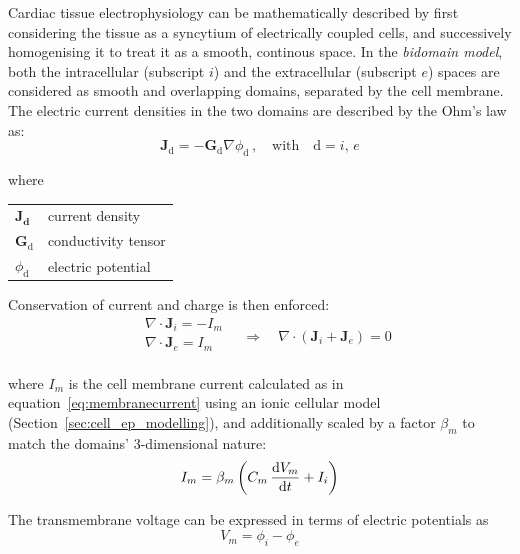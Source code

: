 \vspace{0.2cm}
Cardiac tissue electrophysiology can be mathematically described by first considering the tissue as a syncytium of electrically coupled cells, and successively homogenising it to treat it as a smooth, continous space. In the \textit{bidomain model}, both the intracellular (subscript $i$) and the extracellular (subscript $e$) spaces are considered as smooth and overlapping domains, separated by the cell membrane. The electric current densities in the two domains are described by the Ohm's law as:
%
\begin{equation}\label{eq:ohmslaw}
    \mathbf{J}_{\text{d}} = -\mathbf{G}_{\text{d}}\nabla\phi_{\text{d}}\,,\quad\text{with}\quad \text{d}=i,\,e
\end{equation}

\noindent
where

\vspace{0.2cm}
\begin{tabular}{ll}
    $\mathbf{\mathbf{J}_{\text{d}}}$ & current density \\
    $\mathbf{G}_{\text{d}}$ & conductivity tensor \\
    $\phi_{\text{d}}$ & electric potential \\
\end{tabular}

\vspace{0.2cm}\noindent
Conservation of current and charge is then enforced:
%
\begin{equation}
    \begin{aligned}
        & \nabla\cdot\mathbf{J}_i = -I_m \\
        & \nabla\cdot\mathbf{J}_e =  I_m \\
    \end{aligned}\quad\Rightarrow\quad \nabla\cdot(\mathbf{J}_i+\mathbf{J}_e) = 0
\end{equation}

\noindent
where $I_m$ is the cell membrane current calculated as in equation~\eqref{eq:membranecurrent} using an ionic cellular model (Section~\ref{sec:cell_ep_modelling}), and additionally scaled by a factor $\beta_m$ to match the domains' $3$-dimensional nature:
%
\begin{equation}\label{eq:membranecurrentsc}
    I_m = \beta_m\left(C_m\,\dfrac{\mathrm{d}{V_m}}{\mathrm{d}{t}} + I_i\right)
\end{equation}

\noindent
The transmembrane voltage can be expressed in terms of electric potentials as
%
\begin{equation}
    V_m = \phi_i - \phi_e
\end{equation}

